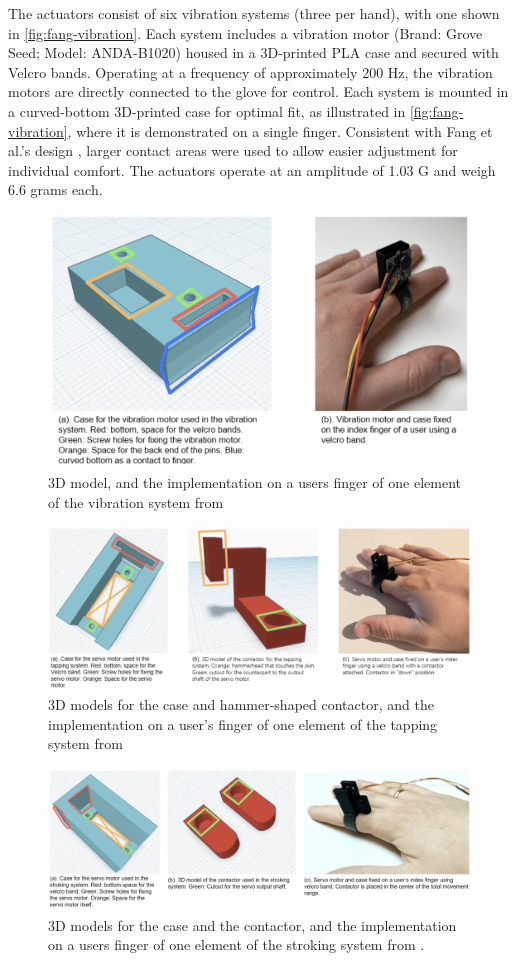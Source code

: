 The actuators consist of six vibration systems (three per hand), with one shown in \autoref{fig:fang-vibration}. Each system includes a vibration motor (Brand: Grove Seed; Model: ANDA-B1020) housed in a 3D-printed PLA case and secured with Velcro bands. Operating at a frequency of approximately 200 Hz, the vibration motors are directly connected to the glove for control. Each system is mounted in a curved-bottom 3D-printed case for optimal fit, as illustrated in \autoref{fig:fang-vibration}, where it is demonstrated on a single finger. Consistent with Fang et al.’s design \cite{Fang2023}, larger contact areas were used to allow easier adjustment for individual comfort. The actuators operate at an amplitude of 1.03 G and weigh 6.6 grams each.

\begin{figure}
     \centering
     \includegraphics[width=0.5\linewidth]{src/pictures/Screenshot 2024-09-12 at 15.11.57.png}
     \caption{3D model, and the implementation on a users finger of one element of the vibration system from \cite{Fang2023}}
     \label{fig:fang-vibration}
 \end{figure}
\begin{figure}
    \centering
    \includegraphics[width=0.5\linewidth]{src/pictures/Screenshot 2024-09-12 at 15.11.38.png}
    \caption{3D models for the case and hammer-shaped contactor, and the implementation on a user’s finger of one element of the tapping system from \cite{Fang2023}}
    \label{fig:fang-tapping}
\end{figure}
\begin{figure}
    \centering
    \includegraphics[width=0.5\linewidth]{src/pictures/Screenshot 2024-09-12 at 15.10.49.png}
    \caption{3D models for the case and the contactor, and the implementation on a users finger of one element of the stroking system from \cite{Fang2023}.}
    \label{fig:fang-stroking}
\end{figure}

